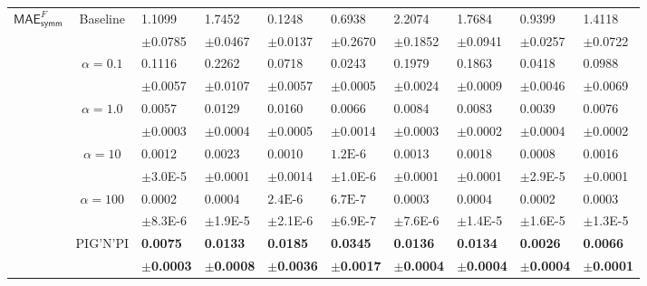 \documentclass{article}
\newcommand{\pignpi}{PIG'N'PI\xspace}
\begin{document}
\begin{table}[h!]
{\begin{tabularx}{\textwidth}{ccX X X X X X X X}
    
        \multirow{12}{*}{$\textsf{MAE}_\textsf{symm}^{F}$}

        &\multirow{2}{*}{Baseline}
        &1.1099 & 1.7452 & 0.1248 & 0.6938 & 2.2074 & 1.7684 & 0.9399 & 1.4118\\
        &&\scriptsize$\pm$0.0785 & \scriptsize $\pm$0.0467 & \scriptsize $\pm$0.0137 & \scriptsize $\pm$0.2670 & \scriptsize $\pm$0.1852 & \scriptsize $\pm$0.0941 & \scriptsize $\pm$0.0257 & \scriptsize $\pm$0.0722\\
        \cline{3-10}\rule{0pt}{2.3ex}

        & \multirow{2}{*}{$\alpha=0.1$}
        & 0.1116 & 0.2262 & 0.0718 & 0.0243 & 0.1979 & 0.1863 & 0.0418 & 0.0988\\
        &&\scriptsize$\pm$0.0057 & \scriptsize $\pm$0.0107 & \scriptsize $\pm$0.0057 & \scriptsize $\pm$0.0005 & \scriptsize $\pm$0.0024 & \scriptsize $\pm$0.0009 & \scriptsize $\pm$0.0046 & \scriptsize $\pm$0.0069\\

        \cline{3-10}\rule{0pt}{2.3ex}
        & \multirow{2}{*}{$\alpha=1.0$}
        & 0.0057 & 0.0129 & 0.0160 & 0.0066 & 0.0084 & 0.0083 & 0.0039 & 0.0076\\
        &&\scriptsize$\pm$0.0003 & \scriptsize $\pm$0.0004 & \scriptsize $\pm$0.0005 & \scriptsize $\pm$0.0014 & \scriptsize $\pm$0.0003 & \scriptsize $\pm$0.0002 & \scriptsize $\pm$0.0004 & \scriptsize $\pm$0.0002\\

        \cline{3-10}\rule{0pt}{2.3ex}
        & \multirow{2}{*}{$\alpha=10$}
        & 0.0012 & 0.0023 & 0.0010 & \small $\text{1.2E-6}$ & 0.0013 & 0.0018 & 0.0008 & 0.0016\\
        && \tiny $\pm$3.0E-5 & \scriptsize $\pm$0.0001 & \scriptsize $\pm$0.0014 & \tiny $\pm$1.0E-6 & \scriptsize $\pm$0.0001 & \scriptsize $\pm$0.0001 & \tiny $\pm$2.9E-5 & \scriptsize $\pm$0.0001\\
        \cline{3-10}\rule{0pt}{2.3ex}

        & \multirow{2}{*}{$\alpha=100$}
        & 0.0002 & 0.0004 & \small $\text{2.4E-6}$& \small $\text{6.7E-7}$ & 0.0003 & 0.0004 & 0.0002 & 0.0003\\
        && \tiny $\pm$8.3E-6 & \tiny $\pm$1.9E-5 & \tiny $\pm$2.1E-6 & \tiny $\pm$6.9E-7 & \tiny $\pm$7.6E-6 & \tiny $\pm$1.4E-5 & \tiny $\pm$1.6E-5 & \tiny $\pm$1.3E-5\\

        \cline{3-10}\rule{0pt}{2.3ex}
        &\multirow{2}{*}{\pignpi}
        &\textbf{0.0075} & \textbf{0.0133} & \textbf{0.0185} & \textbf{0.0345} & \textbf{0.0136} & \textbf{0.0134} & \textbf{0.0026} & \textbf{0.0066}\\
        &&\scriptsize\textbf{$\pm$0.0003} & \scriptsize \textbf{$\pm$0.0008} & \scriptsize \textbf{$\pm$0.0036} & \scriptsize \textbf{$\pm$0.0017} & \scriptsize \textbf{$\pm$0.0004} & \scriptsize \textbf{$\pm$0.0004} & \scriptsize \textbf{$\pm$0.0004} & \scriptsize \textbf{$\pm$0.0001}\\
      \bottomrule
\end{tabularx}
}
\end{table}
\end{document}
